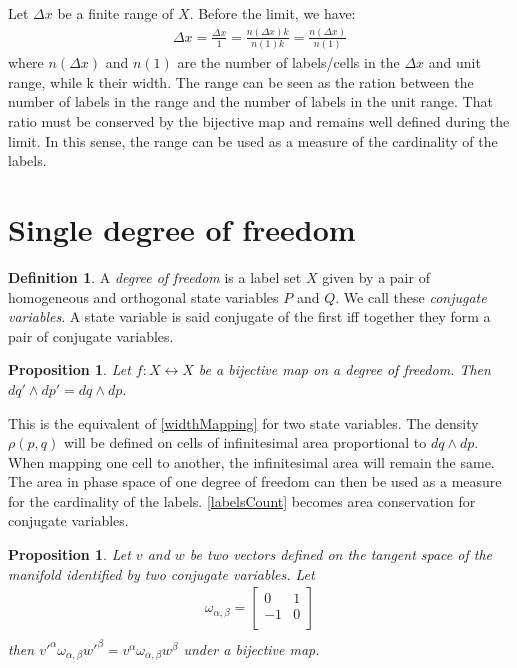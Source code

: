 \documentclass[twocolumn,floatfix,nofootinbib]{revtex4}   %
\theoremstyle{theorem}
\newtheorem{prop}[thm]{Proposition}
\theoremstyle{definition}
\newtheorem{defn}[thm]{Definition}
\begin{document}
Let $\Delta x$ be a finite range of $X$. Before the limit, we have:
\begin{align*}
\Delta x = \frac{\Delta x}{1} = \frac{n(\Delta x) k}{n(1) k} = \frac{n(\Delta x)}{n(1)}
\end{align*}
where $n(\Delta x)$ and $n(1)$ are the number of labels/cells in the $\Delta x$ and unit range, while k their width. The range can be seen as the ration between the number of labels in the range and the number of labels in the unit range. That ratio must be conserved by the bijective map and remains well defined during the limit. In this sense, the range can be used as a measure of the cardinality of the labels.

\section{Single degree of freedom}

\begin{defn}\label{sdof}
A \emph{degree of freedom} is a label set $X$ given by a pair of homogeneous and orthogonal state variables $P$ and $Q$. We call these \emph{conjugate variables}. A state variable is said conjugate of the first iff together they form a pair of conjugate variables.
\end{defn}

\begin{prop}\label{sdofMap}
Let $f: X \leftrightarrow X$ be a bijective map on a degree of freedom. Then $dq' \wedge dp' = dq \wedge dp$.
\end{prop}

This is the equivalent of \ref{widthMapping} for two state variables. The density $\rho(p,q)$ will be defined on cells of infinitesimal area proportional to $dq \wedge dp$. When mapping one cell to another, the infinitesimal area will remain the same. The area in phase space of one degree of freedom can then be used as a measure for the cardinality of the labels. \ref{labelsCount} becomes area conservation for conjugate variables. 

\begin{prop}\label{sdofInvariant}
Let $v$ and $w$ be two vectors defined on the tangent space of the manifold identified by two conjugate variables. Let
\begin{align*}
\omega_{\alpha, \beta} = \left[
  \begin{array}{cc}
    0 & 1 \\
    -1 & 0 \\
  \end{array}
\right] \\
\end{align*}
then $v'^{\alpha} \omega_{\alpha, \beta} w'^{\beta}=v^{\alpha} \omega_{\alpha, \beta} w^{\beta}$ under a bijective map.
\end{prop}
\end{document}
